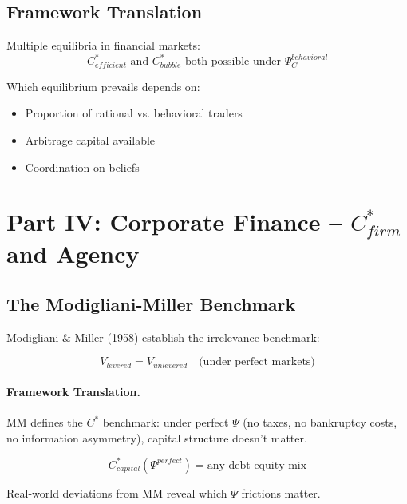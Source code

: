\subsection{Framework Translation}

Multiple equilibria in financial markets:
\begin{equation}
C^*_{efficient} \text{ and } C^*_{bubble} \text{ both possible under } \Psi_C^{behavioral}
\end{equation}

Which equilibrium prevails depends on:
\begin{itemize}
    \item Proportion of rational vs. behavioral traders
    \item Arbitrage capital available
    \item Coordination on beliefs
\end{itemize}


\section{Part IV: Corporate Finance -- $C^*_{firm}$ and Agency}
\label{sec:Y-corporate}

\subsection{The Modigliani-Miller Benchmark}

Modigliani \& Miller (1958) establish the irrelevance benchmark:

\begin{equation}
\boxed{
V_{levered} = V_{unlevered} \quad \text{(under perfect markets)}
}
\label{eq:mm}
\end{equation}

\paragraph{Framework Translation.}
MM defines the $C^*$ benchmark: under perfect $\Psi$ (no taxes, no bankruptcy
costs, no information asymmetry), capital structure doesn't matter.

\begin{equation}
C^*_{capital}(\Psi^{perfect}) = \text{any debt-equity mix}
\end{equation}

Real-world deviations from MM reveal which $\Psi$ frictions matter.

